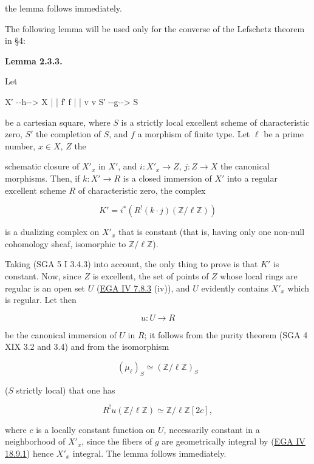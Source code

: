\documentclass[
  11pt,
  a4paper,
]{book}
\newenvironment{Shaded}{}{}
\newcommand{\NormalTok}[1]{#1}
\begin{document}
the lemma follows immediately.

The following lemma will be used only for the converse of the Lefschetz
theorem in §4:

\textbf{Lemma 2.3.3.}

Let

\begin{Shaded}
\begin{Highlighting}[]
\NormalTok{X′ {-}{-}h{-}{-}\textgreater{} X}
\NormalTok{|         |}
\NormalTok{f′        f}
\NormalTok{|         |}
\NormalTok{v         v}
\NormalTok{S′ {-}{-}g{-}{-}\textgreater{} S}
\end{Highlighting}
\end{Shaded}

be a cartesian square, where \(S\) is a strictly local excellent scheme
of characteristic zero, \(S'\) the completion of \(S\), and \(f\) a
morphism of finite type. Let \(\ell\) be a prime number, \(x \in X\),
\(Z\) the

schematic closure of \(X'_{x}\) in \(X'\), and \(i : X'_{x} \to Z\),
\(j : Z \to X\) the canonical morphisms. Then, if \(k : X'
\to R\) is a closed immersion of \(X'\) into a regular excellent scheme
\(R\) of characteristic zero, the complex

\[ K' = i^{*}(R^{!}(k \cdot j)(\mathbb{Z}/\ell \mathbb{Z})) \]

is a dualizing complex on \(X'_{x}\) that is constant (that is, having
only one non-null cohomology sheaf, isomorphic to
\(\mathbb{Z}/\ell \mathbb{Z}\)).

Taking (SGA 5 I 3.4.3) into account, the only thing to prove is that
\(K'\) is constant. Now, since \(Z\) is excellent, the set of points of
\(Z\) whose local rings are regular is an open set \(U\)
(\href{https://jcreinhold.github.io/ega/iv/19-ch4-07-noetherian-completion.html\#78-excellent-rings}{EGA
IV 7.8.3} (iv)), and \(U\) evidently contains \(X'_{x}\) which is
regular. Let then

\[ u : U \to R \]

be the canonical immersion of \(U\) in \(R\); it follows from the purity
theorem (SGA 4 XIX 3.2 and 3.4) and from the isomorphism

\[ (\mu_{\ell})_{S} \simeq (\mathbb{Z}/\ell \mathbb{Z})_{S} \]

(\(S\) strictly local) that one has

\[ R^{!} u(\mathbb{Z}/\ell \mathbb{Z}) \simeq \mathbb{Z}/\ell \mathbb{Z}[2c], \]

where \(c\) is a locally constant function on \(U\), necessarily
constant in a neighborhood of \(X'_{x}\), since the fibers of \(g\) are
geometrically integral by
(\href{https://jcreinhold.github.io/ega/iv/31-ch4-18-complements-etale-morphisms.html\#189-formal-fibres-of-henselian-noetherian-rings}{EGA
IV 18.9.1}) hence \(X'_{x}\) integral. The lemma follows immediately.
\end{document}
